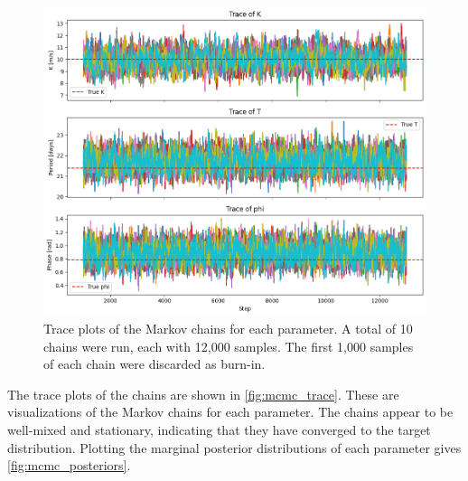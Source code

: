 \documentclass[preprint,longauthor]{aastex631}
\numberwithin{equation}{section}
\begin{document}
\begin{figure}[ht!]
\centering
\includegraphics[width=\textwidth]{../scripts/2.5/figures/traces.png}
\caption{Trace plots of the Markov chains for each parameter. A total of 10 chains were run, each with 12,000 samples. The first 1,000 samples of each chain were discarded as burn-in.}
\label{fig:mcmc_trace}
\end{figure}

The trace plots of the chains are shown in \autoref{fig:mcmc_trace}. These are visualizations of the Markov chains for each parameter. The chains appear to be well-mixed and stationary, indicating that they have converged to the target distribution. Plotting the marginal posterior distributions of each parameter gives \autoref{fig:mcmc_posteriors}.
\end{document}
